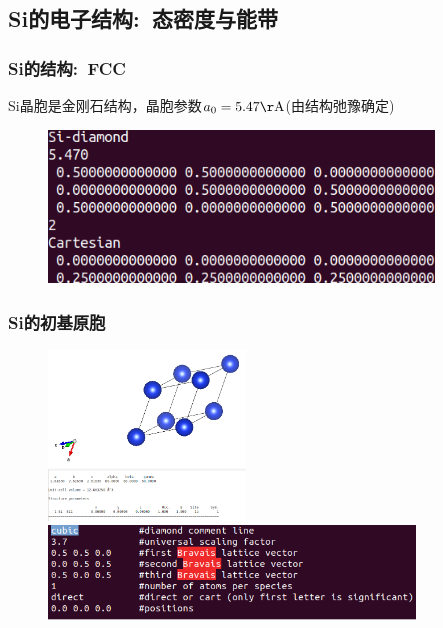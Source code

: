 \subsection{{\rm Si}的电子结构:~态密度与能带}\label{Sec:Si-band}
\frame
{
	\frametitle{\textrm{Si}的结构:~\textrm{FCC}}
\textrm{Si}晶胞是金刚石结构，晶胞参数$a_0=5.47\mathrm{\AA}$(由结构弛豫确定)
\vskip 5pt
\begin{figure}[h!]
\centering
\includegraphics[height=1.6in,viewport=0 0 370 150,clip]{Figures/Si_POSCAR.png}
\caption{\fontsize{6.2pt}{5.2pt}}%
\label{Si_POSCAR}
\end{figure}
}

\frame
{
	\frametitle{\textrm{Si}的初基原胞}
\vspace*{-13pt}
\begin{figure}[h!]
\centering
\includegraphics[height=1.78in]{Figures/VASP_example-Si_POSCAR-1-Fig.png}
\vskip 1pt
\includegraphics[height=0.98in]{Figures/VASP_example-Si_POSCAR-1.png}
\label{Fig:VASP-Si_POSCAR}
\end{figure}
}

